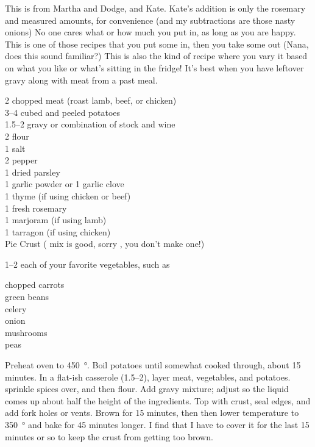 \begin{open}
  This is from Martha and Dodge, and Kate. Kate's addition is only the rosemary
  and measured amounts, for convenience (and my subtractions are those nasty
  onions) No one cares what or how much you put in, as long as you are happy.
  This is one of those recipes that you put some in, then you take some out
  (Nana, does this sound familiar?) This is also the kind of recipe where you
  vary it based on what you like or what's sitting in the fridge! It's best when
  you have leftover gravy along with meat from a past meal.
\end{open}
\begin{ingredients}
  \SI{2}{\cup} chopped meat (roast lamb, beef, or chicken)\\
  \numrange{3}{4} cubed and peeled potatoes\\
  \SIrange{1.5}{2}{\cup} gravy or combination of stock and wine\\
  \SI{2}{\tblspoon} flour\\
  \SI{1}{\teaspoon} salt\\
  \SI{2}{\teaspoon} pepper\\
  \SI{1}{\tblspoon} dried parsley\\
  \SI{1}{\teaspoon} garlic powder or 1 garlic clove\\
  \SI{1}{\teaspoon} thyme (if using chicken or beef)\\
  \SI{1}{\tblspoon} fresh rosemary \\
  \SI{1}{\teaspoon} marjoram (if using lamb)\\
  \SI{1}{\teaspoon} tarragon (if using chicken)\\
  Pie Crust ( mix is good, sorry
  , you don't make one!)
\end{ingredients}
\SIrange{1}{2}{\cup} each of your favorite vegetables, such as
\begin{ingredients}
  chopped carrots\\
  green beans\\
  celery\\
  onion\\
  mushrooms\\
  peas
\end{ingredients}
Preheat oven to \SI{450}{\degree}. Boil potatoes until somewhat cooked through, about
15 minutes. In a flat-ish casserole (\SIrange{1.5}{2}{\quart}), layer meat,
vegetables, and potatoes. sprinkle spices over, and then flour. Add gravy
mixture; adjust so the liquid comes up about half the height of the
ingredients.  Top with crust, seal edges, and add fork holes or vents. Brown
for 15 minutes, then then lower temperature to \SI{350}{\degree} and bake for
45 minutes longer. I find that I have to cover it for the last
15 minutes or so to keep the crust from getting too brown.

